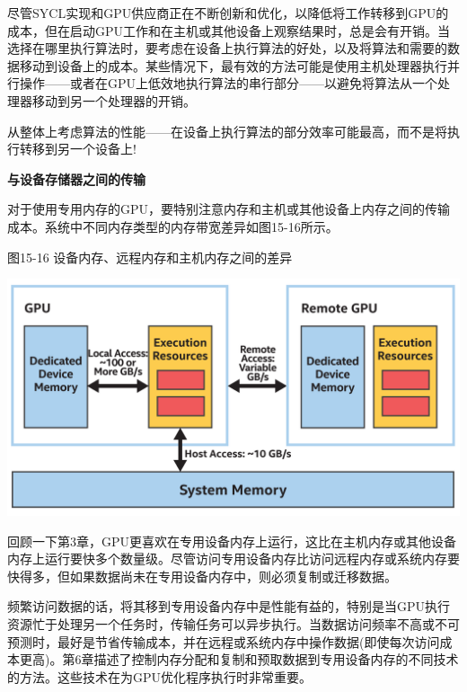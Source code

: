 尽管SYCL实现和GPU供应商正在不断创新和优化，以降低将工作转移到GPU的成本，但在启动GPU工作和在主机或其他设备上观察结果时，总是会有开销。当选择在哪里执行算法时，要考虑在设备上执行算法的好处，以及将算法和需要的数据移动到设备上的成本。某些情况下，最有效的方法可能是使用主机处理器执行并行操作——或者在GPU上低效地执行算法的串行部分——以避免将算法从一个处理器移动到另一个处理器的开销。\par

\begin{tcolorbox}[colback=red!5!white,colframe=red!75!black]
从整体上考虑算法的性能——在设备上执行算法的部分效率可能最高，而不是将执行转移到另一个设备上!
\end{tcolorbox}

\hspace*{\fill} \par %
\textbf{与设备存储器之间的传输}

对于使用专用内存的GPU，要特别注意内存和主机或其他设备上内存之间的传输成本。系统中不同内存类型的内存带宽差异如图15-16所示。\par

\hspace*{\fill} \par %
图15-16 设备内存、远程内存和主机内存之间的差异
\begin{center}
	\includegraphics[width=1.0\textwidth]{content/chapter-15/images/12}
\end{center}

回顾一下第3章，GPU更喜欢在专用设备内存上运行，这比在主机内存或其他设备内存上运行要快多个数量级。尽管访问专用设备内存比访问远程内存或系统内存要快得多，但如果数据尚未在专用设备内存中，则必须复制或迁移数据。\par

频繁访问数据的话，将其移到专用设备内存中是性能有益的，特别是当GPU执行资源忙于处理另一个任务时，传输任务可以异步执行。当数据访问频率不高或不可预测时，最好是节省传输成本，并在远程或系统内存中操作数据(即使每次访问成本更高)。第6章描述了控制内存分配和复制和预取数据到专用设备内存的不同技术的方法。这些技术在为GPU优化程序执行时非常重要。\par








